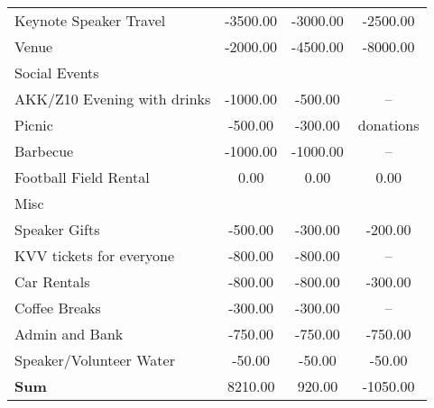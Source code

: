 \begin{tabularx}{\linewidth}{XSSS}
\hspace*{1em} Keynote Speaker Travel  & -3500.00 & -3000.00 & -2500.00\\
\hspace*{1em} Venue  & -2000.00 & -4500.00 & -8000.00\\
\hspace*{1em} Social Events  & {} & {} & {}\\
\hspace*{1em} \hspace*{1em} AKK/Z10 Evening with drinks & -1000.00 & -500.00 & {–}\\
\hspace*{1em} \hspace*{1em} Picnic & -500.00 & -300.00 & {donations}\\
\hspace*{1em} \hspace*{1em} Barbecue & -1000.00 & -1000.00 & {–}\\
\hspace*{1em} \hspace*{1em} Football Field Rental & 0.00 & 0.00 & 0.00\\
\hspace*{1em} Misc  & {} & {} & {}\\
\hspace*{1em} \hspace*{1em} Speaker Gifts & -500.00 & -300.00 & -200.00\\
\hspace*{1em} \hspace*{1em} KVV tickets for everyone & -800.00 & -800.00 & {–}\\
\hspace*{1em} \hspace*{1em} Car Rentals & -800.00 & -800.00 & -300.00\\
\hspace*{1em} \hspace*{1em} Coffee Breaks & -300.00 & -300.00 & {–}\\
\hspace*{1em} \hspace*{1em} Admin and Bank & -750.00 & -750.00 & -750.00\\
\hspace*{1em} \hspace*{1em} Speaker/Volunteer Water & -50.00 & -50.00 & -50.00\\[0.5ex]\hline
\bf Sum \hspace*{1em}  & 8210.00 & 920.00 & -1050.00\\
\end{tabularx}
